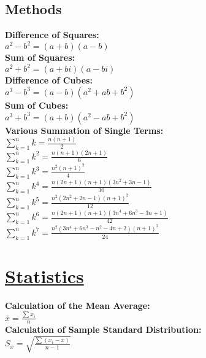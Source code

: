\documentclass[12pt]{article}
\begin{document}
\subsection*{Methods}
\textbf{Difference of Squares:}
    \\ \( a^2 - b^2 = ( a + b ) ( a - b ) \)
\\ \textbf{Sum of Squares:}
    \\ \( a^2 + b^2 = ( a + bi ) ( a - bi ) \)
\\ \textbf{Difference of Cubes:}
    \\ \( a^3 - b^3 = ( a - b )( a^2 + ab + b^2 ) \)
\\ \textbf{Sum of Cubes:}
    \\ \( a^3 + b^3 = ( a + b )( a^2 - ab + b^2 ) \)
\\ \textbf{Various Summation of Single Terms:}
    \\ \( \displaystyle\sum_{k = 1}^n { k } = \displaystyle\frac{ n( n + 1 ) }{ 2 } \)
    \\ \( \displaystyle\sum_{k = 1}^n { k^2 } = \displaystyle\frac{ n( n + 1 )( 2n + 1 ) }{ 6 } \)
    \\ \( \displaystyle\sum_{k = 1}^n { k^3 } = \displaystyle\frac{ n^2( n + 1 )^2 }{ 4 } \)
    \\ \( \displaystyle\sum_{k = 1}^n { k^4 } = \displaystyle\frac{ n( 2n + 1 )( n + 1 )( 3n^2 + 3n - 1 ) }{ 30 } \)
    \\ \( \displaystyle\sum_{k = 1}^n { k^5 } = \displaystyle\frac{ n^2 ( 2n^2 + 2n - 1 )( n + 1 )^2 }{ 12 } \)
    \\ \( \displaystyle\sum_{k = 1}^n { k^6 } = \displaystyle\frac{ n( 2n + 1 )( n + 1 )( 3n^4 + 6n^3 - 3n + 1 ) }{ 42 } \)
    \\ \( \displaystyle\sum_{k = 1}^n { k^7 } = \displaystyle\frac{ n^2 ( 3n^4 + 6n^3 - n^2 - 4n + 2 )( n + 1 )^2 }{ 24 } \)



\section*{\underline{Statistics}}
\textbf{Calculation of the Mean Average:}
    \\ \( \bar{ x } = \displaystyle\frac{ \displaystyle\sum{ x_i } }{ n } \)
\\ \textbf{Calculation of Sample Standard Distribution:}
    \\ \( S_x = \sqrt{ \frac{ \displaystyle\sum{ ( x_i - \bar{ x } ) } }{ n - 1 } } \)
\end{document}
